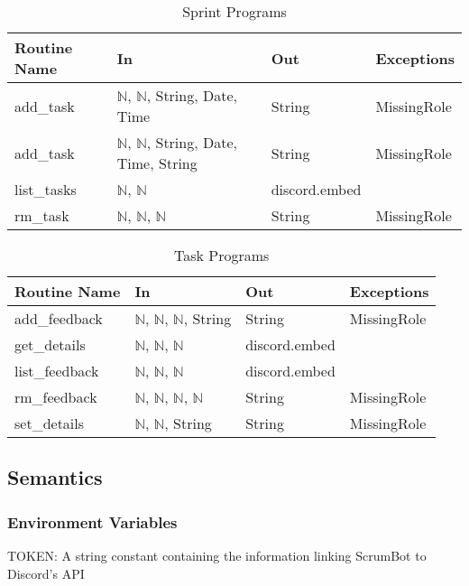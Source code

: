 \documentclass[12pt, titlepage]{article}
\begin{document}
\begin{table}[!htb]
    \centering
    \begin{tabular}{|p{3cm}|p{5.5cm}|p{2.5cm}|p{2.5cm}|}
        \hline
        \textbf{Routine Name} & \textbf{In} & \textbf{Out} & \textbf{Exceptions} \\
        \hline
        add\_task & $\mathbb{N}$, $\mathbb{N}$, String, Date, Time & String & MissingRole\\
        \hline
        add\_task & $\mathbb{N}$, $\mathbb{N}$, String, Date, Time, String & String & MissingRole \\
        \hline
        list\_tasks & $\mathbb{N}$, $\mathbb{N}$ & discord.embed & \\
        \hline
        rm\_task & $\mathbb{N}$, $\mathbb{N}$, $\mathbb{N}$ & String & MissingRole \\
        \hline
    \end{tabular}
    \caption{Sprint Programs}
    \label{tab:sprint}
\end{table}

\begin{table}[H]
    \centering
    \begin{tabular}{|p{3cm}|p{3cm}|p{3cm}|p{4.5cm}|}
        \hline
        \textbf{Routine Name} & \textbf{In} & \textbf{Out} & \textbf{Exceptions} \\
        \hline
        add\_feedback & $\mathbb{N}$, $\mathbb{N}$, $\mathbb{N}$, String & String & MissingRole \\
        \hline
        get\_details & $\mathbb{N}$, $\mathbb{N}$, $\mathbb{N}$ & discord.embed & \\
        \hline
        list\_feedback & $\mathbb{N}$, $\mathbb{N}$, $\mathbb{N}$ & discord.embed & \\
        \hline
        rm\_feedback & $\mathbb{N}$, $\mathbb{N}$, $\mathbb{N}$, $\mathbb{N}$ & String & MissingRole \\
        \hline
        set\_details & $\mathbb{N}$, $\mathbb{N}$, String & String & MissingRole \\
        \hline
    \end{tabular}
    \caption{Task Programs}
    \label{tab:task}
\end{table}

\subsection* {Semantics}
\subsubsection* {Environment Variables}
TOKEN: A string constant containing the information linking ScrumBot to Discord's API
\end{document}
